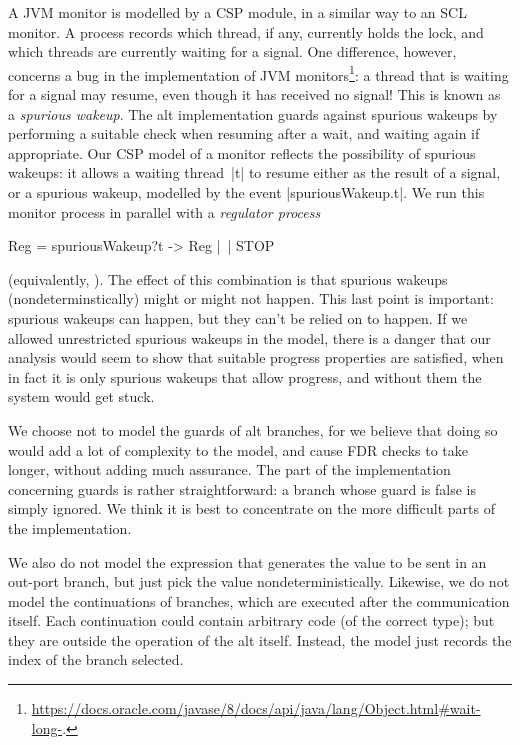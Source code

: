 A JVM monitor is modelled by a CSP module, in a similar way to an SCL monitor.
A process records which thread, if any, currently holds the lock, and which
threads are currently waiting for a signal.  One difference, however, concerns
a bug in the implementation of JVM monitors\footnote{%
  \url{https://docs.oracle.com/javase/8/docs/api/java/lang/Object.html#wait-long-}.}:
a thread that is waiting for a signal may resume, even though it has received
no signal!  This is known as a \emph{spurious wakeup}.  The alt implementation
guards against spurious wakeups by performing a suitable check when resuming
after a wait, and waiting again if appropriate.
%
Our CSP model of a monitor reflects the possibility of spurious wakeups: it
allows a waiting thread~|t| to resume either as the result of a signal, or a
spurious wakeup, modelled by the event |spuriousWakeup.t|.  We run this
monitor process in parallel with a \emph{regulator process}
\begin{cspm}
Reg = spuriousWakeup?t -> Reg |~| STOP
\end{cspm}
(equivalently, ).  
The effect of this combination is that 
spurious wakeups (nondeterminstically) might or might not happen.
%
This last point is important: spurious wakeups can happen, but they can't be
relied on to happen.  If we allowed unrestricted spurious wakeups in the
model, there is a danger that our analysis would seem to show that suitable
progress properties are satisfied, when in fact it is only spurious wakeups
that allow progress, and without them the system would get stuck.

We choose not to model the guards of alt branches, for we believe that doing
so would add a lot of complexity to the model, and cause FDR checks to take
longer, without adding much assurance.  The part of the implementation
concerning guards is rather straightforward: a branch whose guard is false is
simply ignored.  We think it is best to concentrate on the more difficult
parts of the implementation.

We also do not model the expression that generates the value to be sent in an
out-port branch, but just pick the value nondeterministically.  Likewise, we
do not model the continuations of branches, which are executed after the
communication itself.  Each continuation could contain arbitrary code (of the
correct type); but they are outside the operation of the alt itself.  Instead,
the model just records the index of the branch selected.
 

